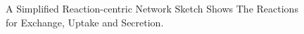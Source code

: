 \begin{figure}[!ht]
	\begin{center}
		\caption{A Simplified Reaction-centric Network Sketch Shows The Reactions for Exchange, Uptake and Secretion.}
		\label{figure-uptake-secretion-cartoon}
	\end{center}
\end{figure}